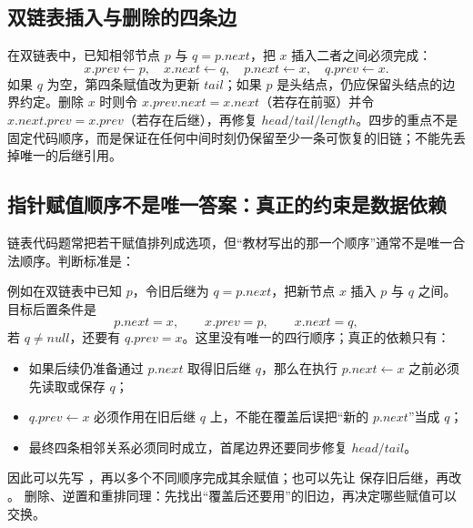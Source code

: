 \documentclass[UTF8,fontset=none,11pt,a4paper]{ctexart}
\begin{document}
\subsection{双链表插入与删除的四条边}
在双链表中，已知相邻节点 $p$ 与 $q=p.next$，把 $x$ 插入二者之间必须完成：
\[
x.prev\leftarrow p,\quad x.next\leftarrow q,\quad p.next\leftarrow x,\quad
q.prev\leftarrow x.
\]
如果 $q$ 为空，第四条赋值改为更新 $tail$；如果 $p$ 是头结点，仍应保留头结点的边界约定。删除 $x$ 时则令 $x.prev.next=x.next$（若存在前驱）并令 $x.next.prev=x.prev$（若存在后继），再修复 $head/tail/length$。四步的重点不是固定代码顺序，而是保证在任何中间时刻仍保留至少一条可恢复的旧链；不能先丢掉唯一的后继引用。

\subsection{指针赋值顺序不是唯一答案：真正的约束是数据依赖}
链表代码题常把若干赋值排列成选项，但“教材写出的那一个顺序”通常不是唯一合法顺序。判断标准是：

例如在双链表中已知 $p$，令旧后继为 $q=p.next$，把新节点 $x$ 插入 $p$ 与 $q$ 之间。目标后置条件是
\[
p.next=x,\qquad x.prev=p,\qquad x.next=q,
\]
若 $q\neq null$，还要有 $q.prev=x$。这里没有唯一的四行顺序；真正的依赖只有：
\begin{itemize}
\item 如果后续仍准备通过 $p.next$ 取得旧后继 $q$，那么在执行 $p.next\leftarrow x$ 之前必须先读取或保存 $q$；
\item $q.prev\leftarrow x$ 必须作用在旧后继 $q$ 上，不能在覆盖后误把“新的 $p.next$”当成 $q$；
\item 最终四条相邻关系必须同时成立，首尾边界还要同步修复 $head/tail$。
\end{itemize}

因此可以先写 ，再以多个不同顺序完成其余赋值；也可以先让  保存旧后继，再改 。 删除、逆置和重排同理：先找出“覆盖后还要用”的旧边，再决定哪些赋值可以交换。
\end{document}

